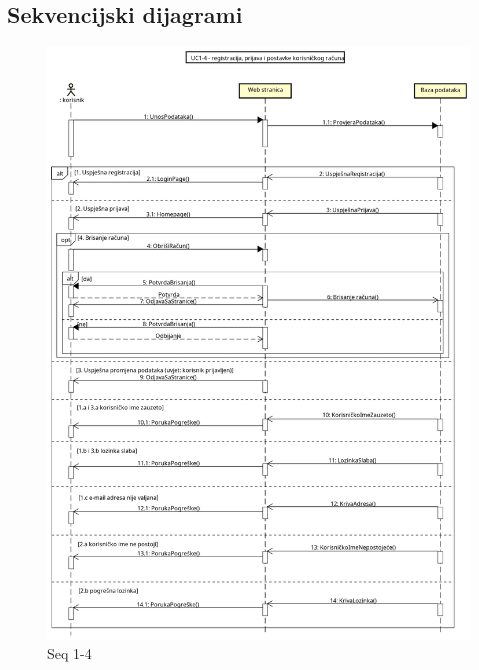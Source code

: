 			\subsection{Sekvencijski dijagrami}
				
				\begin{figure}[H]
					\centering
					\includegraphics[width=1.1\linewidth]{"slike/dijagrami/Seq 1-4"}
					\caption{Seq 1-4}
					\label{fig:seq-1-4}
				\end{figure}
				
